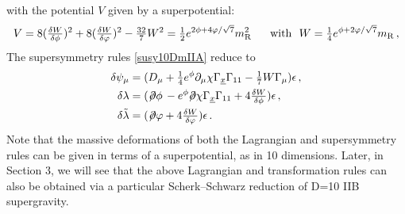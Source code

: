 \documentclass[12pt,a4paper]{article}
\begin{document}
with the potential $V$ given by a superpotential:
\begin{align}
  V = 8 (\tfrac{\delta W}{\delta \phi})^2 + 8 (\tfrac{\delta W}{\delta \varphi})^2
       - \tfrac{32}{7} W^2
    = \tfrac{1}{2} e^{2 \phi + 4 \varphi/\sqrt{7}} m_{\rm R}^2 \text{~~~~ with~~}
  W = \tfrac{1}{4} e^{\phi + 2 \varphi/\sqrt{7}} m_{\rm R} \,,
\end{align}
The supersymmetry rules \eqref{susy10DmIIA} reduce to
\begin{equation}
\begin{aligned}
  \delta \psi_\mu & = (D_\mu
    +\tfrac{1}{4} e^\phi \partial_\mu \chi \Gamma_{\underline{x}} \Gamma_{11}
    -\tfrac{1}{7} W \Gamma_\mu ) \epsilon \,,  \\
  \delta \lambda
  & = (\not \! \partial \phi\,  - e^\phi \! \! \not \! \partial \chi \Gamma_{\underline{x}} \Gamma_{11}
    + 4 \tfrac{\delta W}{\delta \phi} ) \epsilon \,, \\
  \delta \tilde{\lambda}
  & =  (\not \! \partial \varphi + 4 \tfrac{\delta W}{\delta \varphi} ) \epsilon \,.
\end{aligned}
\end{equation}
Note that the massive deformations of both the Lagrangian and
supersymmetry rules can be given in terms of a superpotential, as
in 10 dimensions. Later, in Section 3, we will see that the above
Lagrangian and transformation rules can also be obtained via a
particular Scherk--Schwarz reduction of D=10 IIB supergravity.
\end{document}
